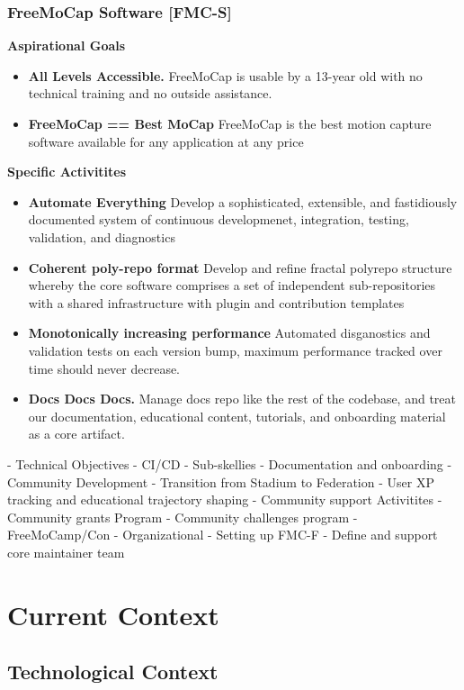 \documentclass[11pt]{article}
\begin{document}
\subsubsection{\textbf{FreeMoCap Software [FMC-S]}}
\textbf{Aspirational Goals}
\begin{itemize}
  \item \textbf{All Levels Accessible.} FreeMoCap is usable by a 13-year old with no technical training and no outside assistance.
  \item \textbf{FreeMoCap == Best MoCap} FreeMoCap is the best motion capture software available for any application at any price
\end{itemize}

\textbf{Specific Activitites}
\begin{itemize}
  \item \textbf{Automate Everything} Develop a sophisticated, extensible, and fastidiously documented system of continuous developmenet, integration, testing, validation, and diagnostics
  \item \textbf{Coherent poly-repo format} Develop and refine fractal polyrepo structure whereby the core software comprises a set of independent sub-repositories with a shared infrastructure with plugin and contribution templates
  \item \textbf{Monotonically increasing performance} Automated disganostics and validation tests on each version bump, maximum performance tracked over time should never decrease. 
  \item \textbf{Docs Docs Docs.} Manage docs repo like the rest of the codebase, and treat our documentation, educational content, tutorials, and onboarding material as a core artifact. 
\end{itemize}

 - Technical Objectives
    - CI/CD
    - Sub-skellies
    - Documentation and onboarding
 - Community Development
    - Transition from Stadium to Federation \cite{egbahl2020}
    - User XP tracking and educational trajectory shaping
    - Community support Activitites
      - Community grants Program
      - Community challenges program 
      - FreeMoCamp/Con
 - Organizational 
    - Setting up FMC-F
    - Define and support core maintainer team

\newpage

\section{Current Context}
\subsection{Technological Context}
\end{document}
